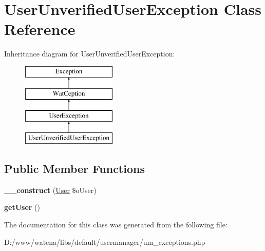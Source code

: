 \hypertarget{class_user_unverified_user_exception}{\section{User\-Unverified\-User\-Exception Class Reference}
\label{class_user_unverified_user_exception}
}
Inheritance diagram for User\-Unverified\-User\-Exception\-:\begin{figure}[H]
\begin{center}
\leavevmode
\includegraphics[height=4.000000cm]{class_user_unverified_user_exception}
\end{center}
\end{figure}
\subsection*{Public Member Functions}
\begin{DoxyCompactItemize}
\item 
\hypertarget{class_user_unverified_user_exception_af40a12c941f46959d17a6fbaa17877ba}{{\bfseries \-\_\-\-\_\-construct} (\hyperlink{class_user}{User} \$o\-User)}\label{class_user_unverified_user_exception_af40a12c941f46959d17a6fbaa17877ba}

\item 
\hypertarget{class_user_unverified_user_exception_aee1b5fb483296a0b39490428e62328e6}{{\bfseries get\-User} ()}\label{class_user_unverified_user_exception_aee1b5fb483296a0b39490428e62328e6}

\end{DoxyCompactItemize}


The documentation for this class was generated from the following file\-:\begin{DoxyCompactItemize}
\item 
D\-:/www/watena/libs/default/usermanager/um\-\_\-exceptions.\-php\end{DoxyCompactItemize}

